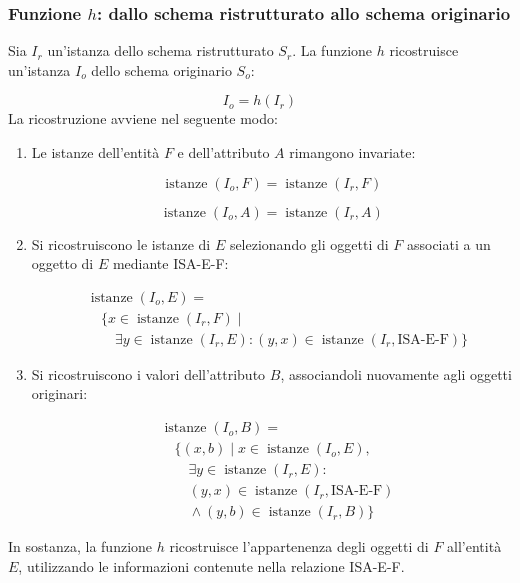 \subsubsection*{Funzione $h$: dallo schema ristrutturato
allo schema originario}

Sia $I_r$ un'istanza dello schema ristrutturato $S_r$.
La funzione $h$ ricostruisce un'istanza $I_o$
dello schema originario $S_o$:

\[
I_o=h(I_r)
\]
La ricostruzione avviene nel seguente modo:

\begin{enumerate}
    \item Le istanze dell'entità $F$ e
    dell'attributo $A$ rimangono invariate:

    \[
    \operatorname{istanze}(I_o,F)
    =
    \operatorname{istanze}(I_r,F)
    \]

    \[
    \operatorname{istanze}(I_o,A)
    =
    \operatorname{istanze}(I_r,A)
    \]

    \item Si ricostruiscono le istanze di $E$
    selezionando gli oggetti di $F$ associati
    a un oggetto di $E$ mediante ISA-E-F:

    \[
    \begin{aligned}
    &\operatorname{istanze}(I_o,E)=\\
    &\quad\{x\in\operatorname{istanze}(I_r,F)\mid\\
    &\qquad \exists y\in\operatorname{istanze}(I_r,E):
    (y,x)\in
    \operatorname{istanze}(I_r,\text{ISA-E-F})\}
    \end{aligned}
    \]

    \item Si ricostruiscono i valori dell'attributo
    $B$, associandoli nuovamente agli oggetti
    originari:

    \[
    \begin{aligned}
    &\operatorname{istanze}(I_o,B)=\\
    &\quad\{(x,b)\mid
    x\in\operatorname{istanze}(I_o,E),\\
    &\qquad \exists y\in\operatorname{istanze}(I_r,E):\\
    &\qquad (y,x)\in
    \operatorname{istanze}(I_r,\text{ISA-E-F})\\
    &\qquad \land
    (y,b)\in\operatorname{istanze}(I_r,B)\}
    \end{aligned}
    \]
\end{enumerate}
\noindent
In sostanza, la funzione $h$ ricostruisce
l'appartenenza degli oggetti di $F$ all'entità $E$,
utilizzando le informazioni contenute nella
relazione ISA-E-F.


